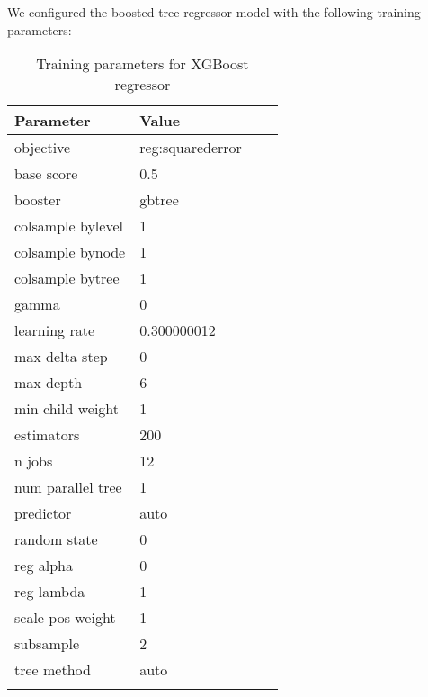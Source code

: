 \documentclass[sn-mathphys]{sn-jnl}%
\theoremstyle{thmstyleone}%
\theoremstyle{thmstyletwo}%
\theoremstyle{thmstylethree}%
\begin{document}
We configured the boosted tree regressor model with the following training parameters:

\begin{table}[h]
      \begin{center}
      \begin{minipage}{174pt}
      \caption{Training parameters for XGBoost regressor}\label{xgboosttable}%
      \begin{tabular}{@{}llll@{}}
      \toprule
      Parameter               & Value \\
      \midrule
      objective               & reg:squarederror  \\
      base score              & 0.5 \\
      booster                 & gbtree  \\
      colsample bylevel       & 1 \\
      colsample bynode        & 1 \\
      colsample bytree        & 1 \\
      gamma\footnotemark[1]   & 0 \\
      learning rate           & 0.300000012 \\
      max delta step          & 0 \\
      max depth               & 6 \\
      min child weight        & 1 \\
      estimators              & 200  \\
      n jobs                  & 12  \\
      num parallel tree       & 1 \\
      predictor               & auto  \\
      random state            & 0 \\
      reg alpha               & 0 \\
      reg lambda              & 1 \\
      scale pos weight        & 1 \\
      subsample               & 2 \\
      tree method             & auto  \\
      \botrule
      \end{tabular}
      \end{minipage}
      \end{center}
\end{table}
\end{document}
